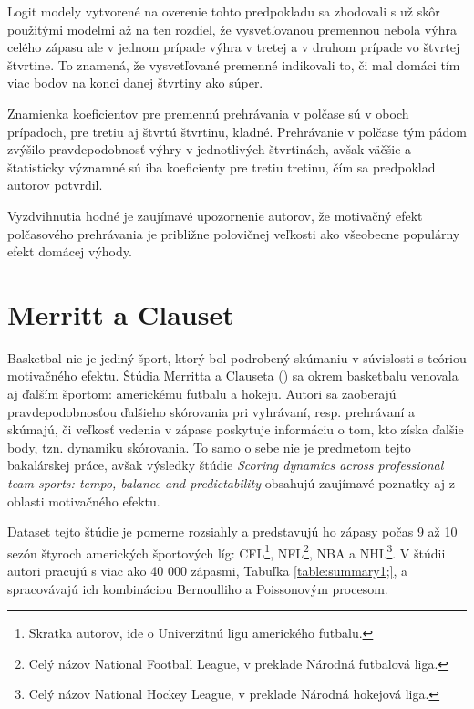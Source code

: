 \documentclass[
  digital, %
  oneside, %
  notable,   %
  lof,     %
  lot,     %
]{fithesis3}
\begin{document}
		Logit modely vytvorené na overenie tohto predpokladu sa zhodovali s už skôr použitými modelmi až na ten rozdiel, že vysvetľovanou premennou nebola výhra celého zápasu ale v jednom prípade výhra v tretej a v druhom prípade vo štvrtej štvrtine. To znamená, že vysvetľované premenné indikovali to, či mal domáci tím viac bodov na konci danej štvrtiny ako súper. 
		
		Znamienka koeficientov pre premennú prehrávania v polčase sú v oboch prípadoch, pre tretiu aj štvrtú štvrtinu, kladné. Prehrávanie v polčase tým pádom zvýšilo pravdepodobnosť výhry v jednotlivých štvrtinách, avšak väčšie a štatisticky významné sú iba koeficienty pre tretiu tretinu, čím sa predpoklad autorov potvrdil. 			
			
		Vyzdvihnutia hodné je zaujímavé upozornenie autorov, že motivačný efekt polčasového prehrávania je približne polovičnej veľkosti ako všeobecne populárny efekt domácej výhody.

		\section{Merritt a Clauset}
		Basketbal nie je jediný šport, ktorý bol podrobený skúmaniu v súvislosti s teóriou motivačného efektu. Štúdia Merritta a Clauseta (\citeyear{merritt2014}) sa okrem basketbalu venovala aj ďalším športom: americkému futbalu a hokeju. Autori sa zaoberajú pravdepodobnosťou ďalšieho skórovania pri vyhrávaní, resp. prehrávaní a skúmajú, či veľkosť vedenia v zápase poskytuje informáciu o tom, kto získa ďalšie body, tzn. dynamiku skórovania. To samo o sebe nie je predmetom tejto bakalárskej práce, avšak výsledky štúdie \textit{Scoring dynamics across professional team sports: tempo, balance and predictability} obsahujú zaujímavé poznatky aj z oblasti motivačného efektu.
		
		Dataset tejto štúdie je pomerne rozsiahly a predstavujú ho zápasy počas 9 až 10  sezón štyroch amerických športových líg: CFL\footnote{Skratka autorov, ide o Univerzitnú ligu amerického futbalu.}, NFL\footnote{Celý názov National Football League, v preklade Národná futbalová liga.}, NBA a NHL\footnote{Celý názov National Hockey League, v preklade Národná hokejová liga.}. V štúdii autori pracujú s viac ako 40 000 zápasmi, Tabuľka \ref{table:summary1;}, a spracovávajú ich kombináciou Bernoulliho a Poissonovým procesom.
	
\end{document}

